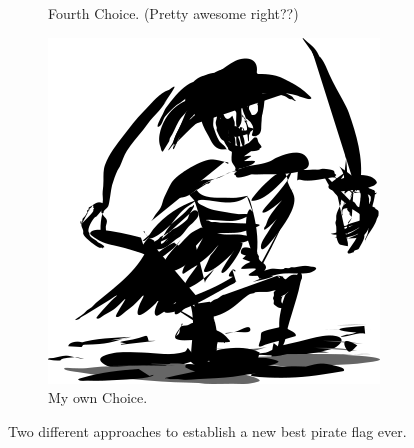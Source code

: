 \documentclass{article}
\begin{document}
\begin{figure}[H]
\begin{subfigure}[b]{0.4\linewidth}
    \caption{Fourth Choice. (Pretty awesome right??)}
  \end{subfigure}
  \begin{subfigure}[b]{0.7\linewidth}
    \includegraphics[width=\linewidth]{resources/pirates4.png}
    \caption{My own Choice.}
  \end{subfigure}

  \caption{Two different approaches to establish a new best pirate flag ever.}
  \label{fig:pflag-compare}
\end{figure}
\end{document}
